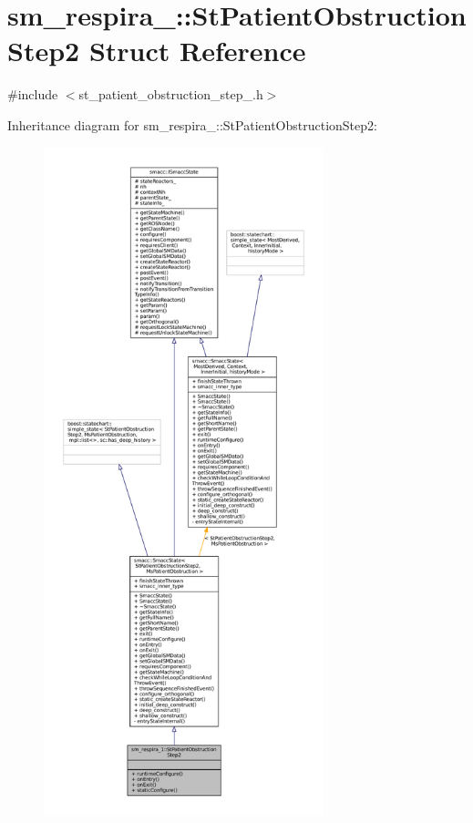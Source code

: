 \hypertarget{structsm__respira__1_1_1StPatientObstructionStep2}{}\section{sm\+\_\+respira\+\_\+:\+:St\+Patient\+Obstruction\+Step2 Struct Reference}
\label{structsm__respira__1_1_1StPatientObstructionStep2}


{\ttfamily \#include $<$st\+\_\+patient\+\_\+obstruction\+\_\+step\+\_.\+h$>$}



Inheritance diagram for sm\+\_\+respira\+\_\+:\+:St\+Patient\+Obstruction\+Step2\+:
\nopagebreak
\begin{figure}[H]
\begin{center}
\leavevmode
\includegraphics[height=550pt]{structsm__respira__1_1_1StPatientObstructionStep2__inherit__graph}
\end{center}
\end{figure}


